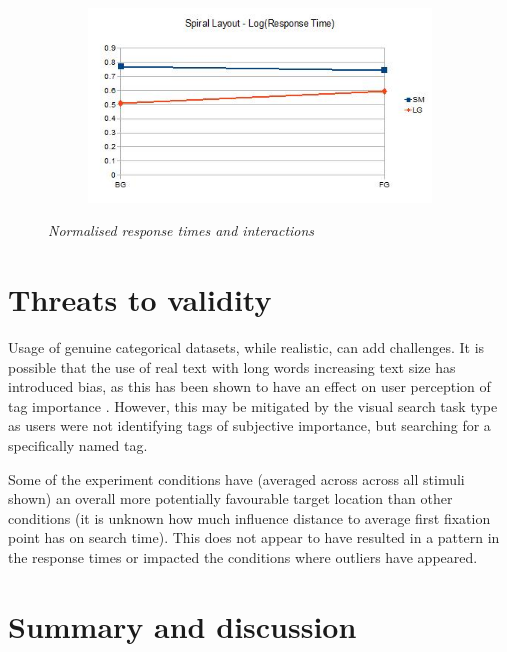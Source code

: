 \begin{figure}[h!]
\begin{subfigure}{.5\textwidth}
\end{subfigure}%
\begin{subfigure}{.5\textwidth}
  \centering
  \includegraphics[scale=0.38]{spiral-log-interaction.jpg}
\end{subfigure}
\caption{\textit{Normalised response times and interactions}}
\label{fig:transformeddata}
\end{figure}

\section{Threats to validity}\label{sect:threatsexp1}

Usage of genuine categorical datasets, while realistic, can add challenges. It is possible that the use of real text with long words increasing text size has introduced bias, as this has been shown to have an effect on user perception of tag importance \citep{bateman08}. However, this may be mitigated by the visual search task type as users were not identifying tags of subjective importance, but searching for a specifically named tag. 

Some of the experiment conditions have (averaged across across all stimuli shown) an overall more potentially favourable target location than other conditions (it is unknown how much influence distance to average first fixation point has on search time). This does not appear to have resulted in a pattern in the response times or impacted the conditions where outliers have appeared. 

\section{Summary and discussion}\label{sect:exp1summary}

